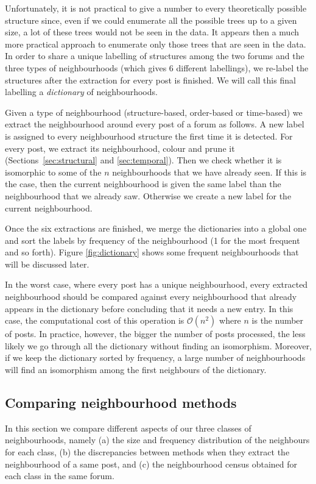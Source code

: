 \documentclass[conference]{IEEEtran}
\begin{document}
Unfortunately, it is not practical to give a number to every theoretically possible structure since, even if we could enumerate all the possible trees up to a given size, a lot of these trees would not be seen in the data. It appears then a much more practical approach to enumerate only those trees that are seen in the data. In order to share a unique labelling of structures among the two forums and the three types of neighbourhoods (which gives 6 different labellings), we re-label the structures after the extraction for every post is finished. We will call this final labelling a \textit{dictionary} of neighbourhoods.

Given a type of neighbourhood (structure-based, order-based or time-based) we extract the neighbourhood around every post of a forum as follows. A new label is assigned to every neighbourhood structure the first time it is detected. For every post, we extract its neighbourhood, colour and prune it (Sections~\ref{sec:structural} and \ref{sec:temporal}). Then we check whether it is isomorphic to some of the $n$ neighbourhoods that we have already seen. If this is the case, then the current neighbourhood is given the same label than the neighbourhood that we already saw. Otherwise we create a new label for the current neighbourhood. 

Once the six extractions are finished, we merge the dictionaries into a global one and sort the labels by frequency of the neighbourhood (1 for the most frequent and so forth). Figure \ref{fig:dictionary} shows some frequent neighbourhoods that will be discussed later.

In the worst case, where every post has a unique neighbourhood, every extracted neighbourhood should be compared against every neighbourhood that already appears in the dictionary before concluding that it needs a new entry. In this case, the computational cost of this operation is $\mathcal{O}(n^2)$ where $n$ is the number of posts. In practice, however, the bigger the number of posts processed, the less likely we go through all the dictionary without finding an isomorphism. Moreover, if we keep the dictionary sorted by frequency, a large number of neighbourhoods will find an isomorphism among the first neighbours of the dictionary. 

\subsection{Comparing neighbourhood methods}
In this section we compare different aspects of our three classes of neighbourhoods, namely (a) the size and frequency distribution of the neighbours for each class, (b) the discrepancies between methods when they extract the neighbourhood of a same post, and (c) the neighbourhood census obtained for each class in the same forum. 
\end{document}
